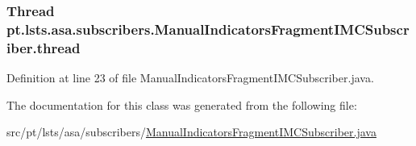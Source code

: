 \subsubsection[{thread}]{\setlength{\rightskip}{0pt plus 5cm}Thread pt.\+lsts.\+asa.\+subscribers.\+Manual\+Indicators\+Fragment\+I\+M\+C\+Subscriber.\+thread\hspace{0.3cm}{\ttfamily [private]}}\label{classpt_1_1lsts_1_1asa_1_1subscribers_1_1ManualIndicatorsFragmentIMCSubscriber_ac688b3e00ef68800684d04ad43ba2fc7}


Definition at line 23 of file Manual\+Indicators\+Fragment\+I\+M\+C\+Subscriber.\+java.



The documentation for this class was generated from the following file\+:\begin{DoxyCompactItemize}
\item 
src/pt/lsts/asa/subscribers/\hyperlink{ManualIndicatorsFragmentIMCSubscriber_8java}{Manual\+Indicators\+Fragment\+I\+M\+C\+Subscriber.\+java}\end{DoxyCompactItemize}
